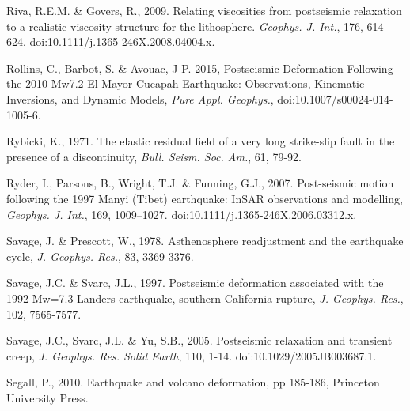 \documentclass[extra]{gji}
\begin{document}
\begin{thebibliography}{}
 Riva, R.E.M. \&
  Govers, R., 2009. Relating viscosities from postseismic relaxation
  to a realistic viscosity structure for the
  lithosphere. \textit{Geophys. J.  Int.}, 176,
  614-624. doi:10.1111/j.1365-246X.2008.04004.x.

 Rollins, C., Barbot,
  S. \& Avouac, J-P. 2015, Postseismic Deformation Following the 2010
  Mw7.2 El Mayor-Cucapah Earthquake: Observations, Kinematic
  Inversions, and Dynamic Models, \textit{Pure Appl. Geophys.},
  doi:10.1007/s00024-014-1005-6.

 Rybicki, K., 1971. The elastic
  residual field of a very long strike-slip fault in the presence of a
  discontinuity, \textit{Bull. Seism. Soc. Am.}, 61, 79-92.

 Ryder, I., Parsons, B.,
  Wright, T.J. \& Funning, G.J., 2007.  Post-seismic motion following
  the 1997 Manyi (Tibet) earthquake: InSAR observations and
  modelling, \textit{Geophys. J. Int.}, 169,
  1009–1027. doi:10.1111/j.1365-246X.2006.03312.x.

 Savage, J. \&
  Prescott, W., 1978. Asthenosphere readjustment and the earthquake
  cycle, \textit{J. Geophys. Res.}, 83, 3369-3376.

 Savage, J.C. \& Svarc, J.L.,
  1997. Postseismic deformation associated with the 1992 Mw=7.3
  Landers earthquake, southern California rupture,
  \textit{J. Geophys. Res.}, 102, 7565-7577.

 Savage, J.C., Svarc, J.L. \& Yu,
  S.B., 2005. Postseismic relaxation and transient creep,
  \textit{J. Geophys. Res. Solid Earth}, 110,
  1-14. doi:10.1029/2005JB003687.1.

 Segall, P., 2010. Earthquake and
  volcano deformation, pp 185-186, Princeton University Press.

\end{thebibliography}
\end{document}
